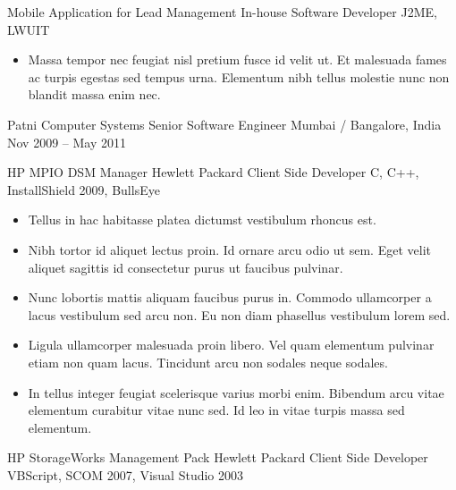 \documentclass[10pt, a4paper]{cvhari}
\begin{document}
        \project
            {Mobile Application for Lead Management}
            {In-house}
            {Software Developer}
            {J2ME, LWUIT}
    
        \begin{itemize}
            \item Massa tempor nec feugiat nisl pretium fusce id velit ut. Et malesuada fames ac turpis egestas sed tempus urna. Elementum nibh tellus molestie nunc non blandit massa enim nec.\smallskip
        \end{itemize}

\smallskip
\divider
\smallskip

    \company
        {Patni Computer Systems}
        {Senior Software Engineer}
        {Mumbai / Bangalore, India}
        {Nov 2009 – May 2011}
        
        \project
            {HP MPIO DSM Manager}
            {Hewlett Packard}
            {Client Side Developer}
            {C, C++, InstallShield 2009, BullsEye}
    
            \begin{itemize}
                \item Tellus in hac habitasse platea dictumst vestibulum rhoncus est.\smallskip
                \item Nibh tortor id aliquet lectus proin. Id ornare arcu odio ut sem. Eget velit aliquet sagittis id consectetur purus ut faucibus pulvinar.\smallskip
                \item Nunc lobortis mattis aliquam faucibus purus in. Commodo ullamcorper a lacus vestibulum sed arcu non. Eu non diam phasellus vestibulum lorem sed.\smallskip
                \item Ligula ullamcorper malesuada proin libero. Vel quam elementum pulvinar etiam non quam lacus. Tincidunt arcu non sodales neque sodales.\smallskip
                \item In tellus integer feugiat scelerisque varius morbi enim. Bibendum arcu vitae elementum curabitur vitae nunc sed. Id leo in vitae turpis massa sed elementum.\smallskip
            \end{itemize}

        \dividergray
        
        \project
            {HP StorageWorks Management Pack}
            {Hewlett Packard}
            {Client Side Developer}
            {VBScript, SCOM 2007, Visual Studio 2003}
        
\end{document}
